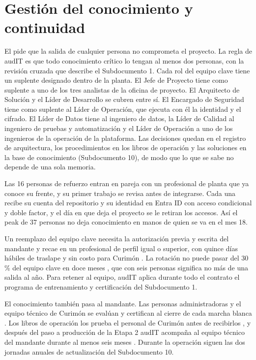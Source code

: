 \section{Gestión del conocimiento y continuidad}\label{sec:12-gestion-del-conocimiento-y-conti}

El  pide que la salida de cualquier persona no comprometa el proyecto. La regla de audIT
es que todo conocimiento crítico lo tengan al menos dos personas, con la revisión cruzada que describe el
Subdocumento 1. Cada rol del equipo clave tiene un suplente designado dentro de la planta. El Jefe de
Proyecto tiene como suplente a uno de los tres analistas de la oficina de proyecto. El Arquitecto de
Solución y el Líder de Desarrollo se cubren entre sí. El Encargado de Seguridad tiene como suplente al
Líder de Operación, que ejecuta con él la identidad y el cifrado. El Líder de Datos tiene al ingeniero
de datos, la Líder de Calidad al ingeniero de pruebas y automatización y el Líder de Operación a uno de
los ingenieros de la operación de la plataforma. Las decisiones quedan en el registro de arquitectura,
los procedimientos en los libros de operación y las soluciones en la base de conocimiento (Subdocumento
10), de modo que lo que se sabe no depende de una sola memoria.

Las 16 personas de refuerzo entran en pareja con un profesional de planta que ya conoce su frente, y su
primer trabajo se revisa antes de integrarse. Cada una recibe su cuenta del repositorio y su identidad
en Entra ID con acceso condicional y doble factor, y el día en que deja el proyecto se le retiran los
accesos. Así el peak de 37 personas no deja conocimiento en manos de quien se va en el mes 18.

Un reemplazo del equipo clave necesita la autorización previa y escrita del mandante y recae en un
profesional de perfil igual o superior, con quince días hábiles de traslape y sin costo para Curimón
. La rotación no puede pasar del 30 \% del equipo clave en doce meses , que
con seis personas significa no más de una salida al año. Para retener al equipo, audIT aplica durante
todo el contrato el programa de entrenamiento y certificación del Subdocumento 1.

El conocimiento también pasa al mandante. Las personas administradoras y el equipo técnico de Curimón se
evalúan y certifican al cierre de cada marcha blanca . Los libros de operación los
prueba el personal de Curimón antes de recibirlos , y después del paso a
producción de la Etapa 2 audIT acompaña al equipo técnico del mandante durante al menos seis meses
. Durante la operación siguen las dos jornadas anuales de actualización del
Subdocumento 10.
